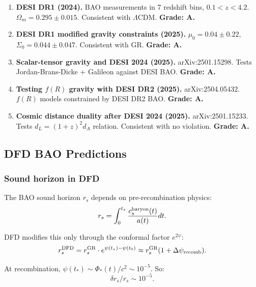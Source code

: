 \documentclass[11pt,a4paper]{article}
\begin{document}
\begin{enumerate}
\item \textbf{DESI DR1 (2024).} BAO measurements in 7 redshift bins, $0.1 < z < 4.2$. $\Omega_m = 0.295 \pm 0.015$. Consistent with $\Lambda$CDM. \textbf{Grade: A.}

\item \textbf{DESI DR1 modified gravity constraints (2025).} $\mu_0 = 0.04 \pm 0.22$, $\Sigma_0 = 0.044 \pm 0.047$. Consistent with GR. \textbf{Grade: A.}

\item \textbf{Scalar-tensor gravity and DESI 2024 (2025).} arXiv:2501.15298. Tests Jordan-Brans-Dicke + Galileon against DESI BAO. \textbf{Grade: A.}

\item \textbf{Testing $f(R)$ gravity with DESI DR2 (2025).} arXiv:2504.05432. $f(R)$ models constrained by DESI DR2 BAO. \textbf{Grade: A.}

\item \textbf{Cosmic distance duality after DESI 2024 (2025).} arXiv:2501.15233. Tests $d_L = (1+z)^2 d_A$ relation. Consistent with no violation. \textbf{Grade: A.}
\end{enumerate}

\subsection{DFD BAO Predictions}

\subsubsection{Sound horizon in DFD}

The BAO sound horizon $r_s$ depends on pre-recombination physics:
\begin{equation}
r_s = \int_0^{t_*}\frac{c_s^{\rm baryon}(t)}{a(t)}dt.
\end{equation}

DFD modifies this only through the conformal factor $e^{2\psi}$:
\begin{equation}
r_s^{\rm DFD} = r_s^{\rm GR} \cdot e^{\psi(t_*) - \psi(t_0)} \approx r_s^{\rm GR}(1 + \Delta\psi_{\rm recomb}).
\end{equation}

At recombination, $\psi(t_*) \sim \Phi_*(t)/c^2 \sim 10^{-5}$. So:
\begin{equation}
\delta r_s/r_s \sim 10^{-5}.
\end{equation}
\end{document}
